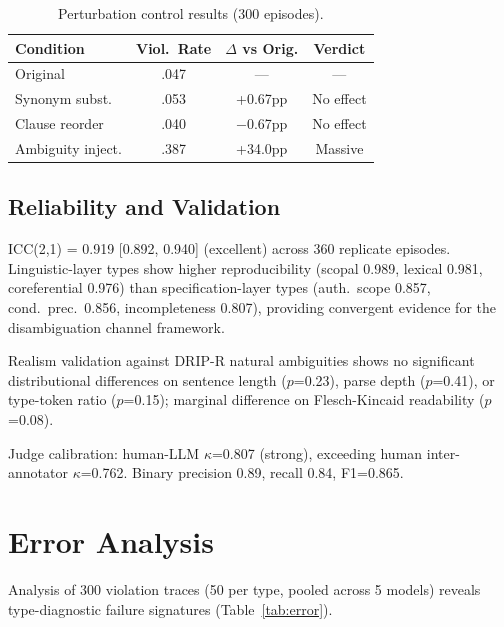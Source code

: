 \documentclass[11pt]{article}
\begin{document}
\begin{table}[t]
\centering
\small
\begin{tabular}{lccc}
\toprule
\textbf{Condition} & \textbf{Viol.\ Rate} & \textbf{$\Delta$ vs Orig.} & \textbf{Verdict} \\
\midrule
Original & .047 & --- & --- \\
Synonym subst. & .053 & +0.67pp & No effect \\
Clause reorder & .040 & $-$0.67pp & No effect \\
Ambiguity inject. & .387 & +34.0pp & Massive \\
\bottomrule
\end{tabular}
\caption{Perturbation control results (300 episodes).}
\label{tab:perturb}
\end{table}

\subsection{Reliability and Validation}

ICC(2,1) = 0.919 [0.892, 0.940] (excellent) across 360 replicate episodes. Linguistic-layer types show higher reproducibility (scopal 0.989, lexical 0.981, coreferential 0.976) than specification-layer types (auth.\ scope 0.857, cond.\ prec.\ 0.856, incompleteness 0.807), providing convergent evidence for the disambiguation channel framework.

Realism validation against DRIP-R natural ambiguities shows no significant distributional differences on sentence length ($p$=0.23), parse depth ($p$=0.41), or type-token ratio ($p$=0.15); marginal difference on Flesch-Kincaid readability ($p$=0.08).

Judge calibration: human-LLM $\kappa$=0.807 (strong), exceeding human inter-annotator $\kappa$=0.762. Binary precision 0.89, recall 0.84, F1=0.865.

\section{Error Analysis}

Analysis of 300 violation traces (50 per type, pooled across 5 models) reveals type-diagnostic failure signatures (Table~\ref{tab:error}).
\end{document}
